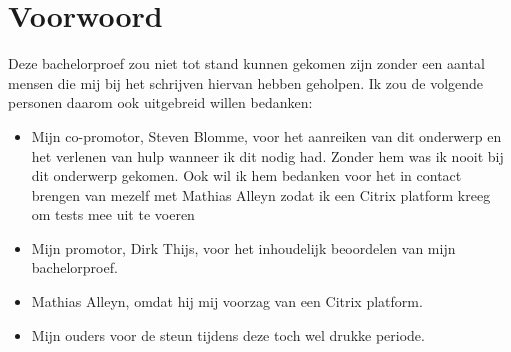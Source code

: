 
\chapter*{Voorwoord}
\label{ch:voorwoord}


Deze bachelorproef zou niet tot stand kunnen gekomen zijn zonder een aantal mensen die mij bij het schrijven hiervan hebben geholpen. Ik zou de volgende personen daarom ook uitgebreid willen bedanken:

\begin{itemize}
	\item Mijn co-promotor, Steven Blomme, voor het aanreiken van dit onderwerp en het verlenen van hulp wanneer ik dit nodig had. Zonder hem was ik nooit bij dit onderwerp gekomen. Ook wil ik hem bedanken voor het in contact brengen van mezelf met Mathias Alleyn zodat ik een Citrix platform kreeg om tests mee uit te voeren
	\item Mijn promotor, Dirk Thijs, voor het inhoudelijk beoordelen van mijn bachelorproef.
	\item Mathias Alleyn, omdat hij mij voorzag van een Citrix platform.
	\item Mijn ouders voor de steun tijdens deze toch wel drukke periode.
\end{itemize}
